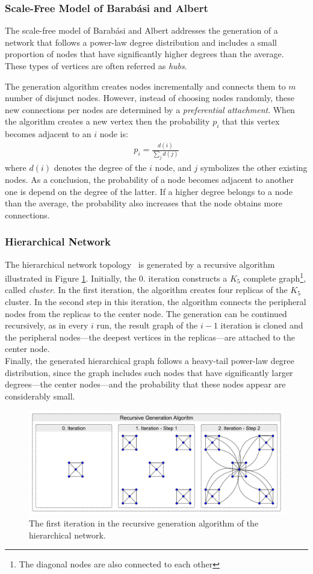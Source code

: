 \subsubsection{Scale-Free Model of Barabási and Albert}

The scale-free model of Barabási and Albert addresses the generation of a network that follows a power-law degree distribution and includes a small proportion of nodes that have significantly higher degrees than the average. These types of vertices are often referred as \textit{hubs}.

The generation algorithm creates nodes incrementally and connects them to $m$ number of disjunct nodes. However, instead of choosing nodes randomly, these new connections per nodes are determined by a \textit{preferential attachment}. When the algorithm creates a new vertex then the probability $p_i$ that this vertex becomes adjacent to an $i$ node is:
\begin{align}
	p_i = \frac{d(i)}{\sum_j d(j)}
\end{align}
where $d(i)$ denotes the degree of the $i$ node, and $j$ symbolizes the other existing nodes. As a conclusion, the probability of a node becomes adjacent to another one is depend on the degree of the latter. If a higher degree belongs to a node than the average, the probability also increases that the node obtains more connections.
\subsubsection{Hierarchical Network}

The hierarchical network topology~\cite{hierarchical} is generated by a recursive algorithm illustrated in Figure \ref{fig:hierarchical_generation}. Initially, the 0. iteration constructs a $K_5$ complete graph\footnote{The diagonal nodes are also connected to each other}, called \textit{cluster}. In the first iteration, the algorithm creates four replicas of the $K_5$ cluster. In the second step in this iteration, the algorithm connects the peripheral nodes from the replicas to the center node. The generation can be continued recursively, as in every $i$ run, the result graph of the $i-1$ iteration is cloned and the peripheral nodes---the deepest vertices in the replicas---are attached to the center node.\\
Finally, the generated hierarchical graph follows a heavy-tail power-law degree distribution, since the graph includes such nodes that have significantly larger degrees---the center nodes---and the probability that these nodes appear are considerably small.

\begin{figure}[!ht]
	\centering
	\includegraphics[width=140mm, keepaspectratio]{figures/hierarchical_generation.pdf}
	\caption{The first iteration in the recursive generation algorithm of the hierarchical network.}
	\label{fig:hierarchical_generation}
\end{figure}
